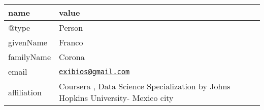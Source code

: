 \documentclass[
]{article}
\begin{document}
\begin{longtable}[]{@{}
  >{\raggedright\arraybackslash}p{}
  >{\raggedright\arraybackslash}p{}@{}}
\toprule
name & value \\
\midrule
\endhead
@type & Person \\
givenName & Franco \\
familyName & Corona \\
email &
\href{mailto:exibios@gmail.com}{\nolinkurl{exibios@gmail.com}} \\
affiliation & Coursera , Data Science Specialization by Johns Hopkins
University- Mexico city \\
\bottomrule
\end{longtable}

\begin{table}


\end{table}
\end{document}
